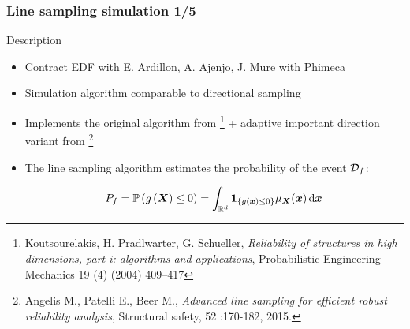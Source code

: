 \documentclass[aspectratio=169]{beamer}
\begin{document}
\begin{frame}
\frametitle{Line sampling simulation 1/5}

\begin{block}{Description}

\begin{itemize}
  \item Contract EDF with E. Ardillon, A. Ajenjo, J. Mure with Phimeca

  \item Simulation algorithm comparable to directional sampling
  
  \item Implements the original algorithm from \footnote{Koutsourelakis, H. Pradlwarter, G. Schueller,
\textit{Reliability of structures in high dimensions, part i: algorithms and applications},
Probabilistic Engineering Mechanics 19 (4) (2004) 409–417}
+ adaptive important direction variant from \footnote{Angelis M., Patelli E., Beer M., \textit{Advanced line sampling for efficient robust reliability analysis},
Structural safety, 52 :170-182, 2015.}

  \item The line sampling algorithm estimates the probability of the event ${\mathcal D}_f$:
  
  $$P_f = {\mathbb{P}}\left(g\left( {\mathbf{\boldsymbol{{X}}}} \right) \leq 0 \right)
        = \int_{{\mathbb R}^{d}} \mathbf{1}_{\{g({\mathbf{\boldsymbol{{x}}}}) \leq 0 \}}\mu_{{\mathbf{\boldsymbol{{X}}}}}({\mathbf{\boldsymbol{{x}}}}){\,\mathrm{d}{\mathbf{\boldsymbol{{x}}}}}$$

\end{itemize}

\end{block}

\end{frame}

\end{document}
